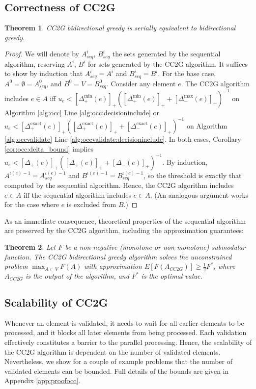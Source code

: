 \documentclass{article} %
\newcommand{\occ}{CC2G}
\newtheorem{thm}{Theorem}[section]
\begin{document}
\subsection{Correctness of \occ{}}
\begin{thm} \occ{} bidirectional greedy is serially equivalent to bidirectional greedy.
\end{thm}
\begin{proof}
We will denote by $A_{seq}^i$, $B_{seq}^i$ the sets generated by the sequential algorithm, reserving $A^i$, $B^i$ for sets generated by the \occ{} algorithm.
It suffices to show by induction that $A_{seq}^i = A^i$ and $B_{seq}^i = B^i$.
For the base case, $A^0 = \emptyset = A_{seq}^0$, and $B^0 = V = B_{seq}^0$.
Consider any element $e$.
The \occ{} algorithm includes $e \in A$ iff $u_e < [\Delta_+^{\min}(e)]_+ ([\Delta_+^{\min}(e)]_+ + [\Delta_-^{\max}(e)]_+)^{-1}$ on Algorithm \ref{alg:occ} Line \ref{alg:occ:decisioninclude} or $u_e < [\Delta_+^{\text{exact}}(e)]_+ ([\Delta_+^{\text{exact}}(e)]_+ + [\Delta_-^{\text{exact}}(e)]_+)^{-1}$ on Algorithm \ref{alg:occvalidate} Line \ref{alg:occvalidate:decisioninclude}.
In both cases, Corollary \ref{cor:occ:delta_bound} implies $u_e < [\Delta_+(e)]_+ ([\Delta_+(e)]_+ + [\Delta_-(e)]_+)^{-1}$.
By induction, $A^{\iota(e)-1} = A_{seq}^{\iota(e)-1}$ and $B^{\iota(e)-1} = B_{seq}^{\iota(e)-1}$, so the threshold is exactly that computed by the sequential algorithm.
Hence, the \occ{} algorithm includes $e \in A$ iff the sequential algorithm includes $e \in A$.
(An analogous argument works for the case where $e$ is excluded from $B$.)

\end{proof}

As an immediate consequence, theoretical properties of the sequential algorithm are preserved by the \occ{} algorithm, including the approximation guarantees:

\begin{thm} Let $F$ be a non-negative (monotone or non-monotone) submodular function.
The \occ{} bidirectional greedy algorithm solves the unconstrained problem $\max_{A\subset V} F(A)$ with approximation
$E[F(A_{\occ{}})] \geq \frac{1}{2}F^*$,
where $A_{\occ{}}$ is the output of the algorithm, and $F^*$ is the optimal value.
\end{thm}




\subsection{Scalability of \occ{}}
Whenever an element is validated, it needs to wait for all earlier elements to be processed, and it blocks all later elements from being processed.
Each validation effectively constitutes a barrier to the parallel processing.
Hence, the scalability of the \occ{} algorithm is dependent on the number of validated elements.
Nevertheless, we show for a couple of example problems that the number of validated elements can be bounded.
Full details of the bounds are given in Appendix \ref{app:proofocc}.
\end{document}
